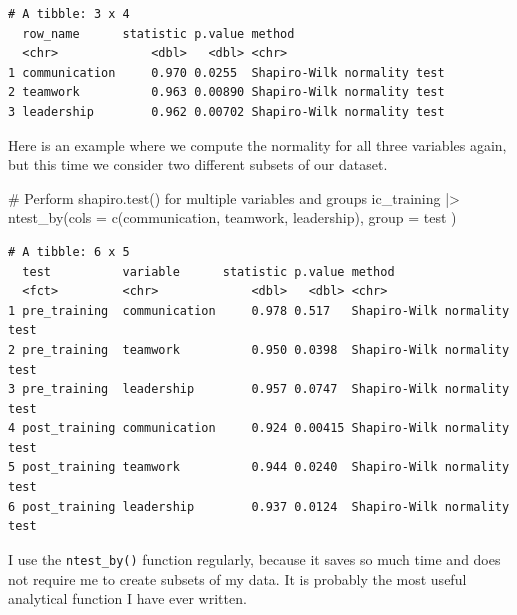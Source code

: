 \documentclass[
  letterpaper,
]{krantz}
\makeatletter
\newenvironment{Shaded}{\begin{snugshade}}{\end{snugshade}}
\newcommand{\AttributeTok}[1]{\textcolor[rgb]{0.40,0.45,0.13}{#1}}
\newcommand{\CommentTok}[1]{\textcolor[rgb]{0.37,0.37,0.37}{#1}}
\newcommand{\FunctionTok}[1]{\textcolor[rgb]{0.28,0.35,0.67}{#1}}
\newcommand{\NormalTok}[1]{\textcolor[rgb]{0.00,0.23,0.31}{#1}}
\newcommand{\SpecialCharTok}[1]{\textcolor[rgb]{0.37,0.37,0.37}{#1}}
\newenvironment{kframe}{%
\medskip{}
\setlength{\fboxsep}{.8em}
 \def\at@end@of@kframe{}%
 \ifinner\ifhmode%
  \def\at@end@of@kframe{\end{minipage}}%
  \begin{minipage}{\columnwidth}%
 \fi\fi%
 \def\FrameCommand##1{\hskip\@totalleftmargin \hskip-\fboxsep
 \colorbox{shadecolor}{##1}\hskip-\fboxsep
     \hskip-\linewidth \hskip-\@totalleftmargin \hskip\columnwidth}%
 \MakeFramed {\advance\hsize-\width
   \@totalleftmargin\z@ \linewidth\hsize
   \@setminipage}}%
 {\par\unskip\endMakeFramed%
 \at@end@of@kframe}
\renewenvironment{Shaded}{\begin{kframe}}{\end{kframe}}
\makeatother
\begin{document}
\begin{verbatim}
# A tibble: 3 x 4
  row_name      statistic p.value method                     
  <chr>             <dbl>   <dbl> <chr>                      
1 communication     0.970 0.0255  Shapiro-Wilk normality test
2 teamwork          0.963 0.00890 Shapiro-Wilk normality test
3 leadership        0.962 0.00702 Shapiro-Wilk normality test
\end{verbatim}

Here is an example where we compute the normality for all three
variables again, but this time we consider two different subsets of our
dataset.

\begin{Shaded}
\begin{Highlighting}[]
\CommentTok{\# Perform \textquotesingle{}shapiro.test()\textquotesingle{} for multiple variables and groups}
\NormalTok{ic\_training }\SpecialCharTok{|\textgreater{}} \FunctionTok{ntest\_by}\NormalTok{(}\AttributeTok{cols =} \FunctionTok{c}\NormalTok{(communication,}
\NormalTok{                                 teamwork,}
\NormalTok{                                 leadership),}
                        \AttributeTok{group =}\NormalTok{ test}
\NormalTok{                        )}
\end{Highlighting}
\end{Shaded}

\begin{verbatim}
# A tibble: 6 x 5
  test          variable      statistic p.value method                     
  <fct>         <chr>             <dbl>   <dbl> <chr>                      
1 pre_training  communication     0.978 0.517   Shapiro-Wilk normality test
2 pre_training  teamwork          0.950 0.0398  Shapiro-Wilk normality test
3 pre_training  leadership        0.957 0.0747  Shapiro-Wilk normality test
4 post_training communication     0.924 0.00415 Shapiro-Wilk normality test
5 post_training teamwork          0.944 0.0240  Shapiro-Wilk normality test
6 post_training leadership        0.937 0.0124  Shapiro-Wilk normality test
\end{verbatim}

I use the \texttt{ntest\_by()} function regularly, because it saves so
much time and does not require me to create subsets of my data. It is
probably the most useful analytical function I have ever written.
\end{document}
